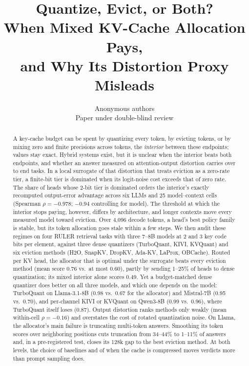 \documentclass{article}
\title{Quantize, Evict, or Both?\\
When Mixed KV-Cache Allocation Pays,\\
and Why Its Distortion Proxy Misleads}
\author{Anonymous authors \\ Paper under double-blind review}
\theoremstyle{definition}
\begin{document}
\maketitle

\begin{abstract}
A key-cache budget can be spent by quantizing every token, by evicting tokens, or by mixing zero and finite precisions across tokens, the \emph{interior} between these endpoints; values stay exact.  Hybrid systems exist, but it is unclear when the interior beats both endpoints, and whether an answer measured on attention-output distortion carries over to end tasks.  In a local surrogate of that distortion that treats eviction as a zero-rate tier, a finite-bit tier is dominated when its logit-noise cost exceeds that of zero rate.  The share of heads whose 2-bit tier is dominated orders the interior's exactly recomputed output-error advantage across six LLMs and 25 model--context cells (Spearman $\rho=-0.978$; $-0.94$ controlling for model).  The threshold at which the interior stops paying, however, differs by architecture, and longer contexts move every measured model toward eviction.  Over 4,096 decode tokens, a head's best policy family is stable, but its token allocation goes stale within a few steps.  We then audit these regimes on four RULER retrieval tasks with three 7--8B models at 2 and 3 key code bits per element, against three dense quantizers (TurboQuant, KIVI, KVQuant) and six eviction methods (H2O, SnapKV, DropKV, Ada-KV, LaProx, OBCache).  Routed per KV head, the allocator that is optimal under the surrogate beats every eviction method (mean score 0.76 vs.\ at most 0.60), partly by sending 1--25\% of heads to dense quantization; its mixed interior alone scores 0.49.
Yet a budget-matched dense quantizer does better on all three models, and which one depends on the model: TurboQuant on Llama-3.1-8B (0.98 vs.\ 0.67 for the allocator) and Mistral-7B (0.95 vs.\ 0.70), and per-channel KIVI or KVQuant on Qwen3-8B (0.99 vs.\ 0.96), where TurboQuant itself loses (0.87).  Output distortion ranks methods only weakly (mean within-cell $\rho=-0.16$) and overstates the cost of rotated quantization noise.  On Llama, the allocator's main failure is truncating multi-token answers.  Smoothing its token scores over neighboring positions cuts truncation from 34--44\% to 1--11\% of answers and, in a pre-registered test, closes its 128k gap to the best eviction method.  At both levels, the choice of baselines and of when the cache is compressed moves verdicts more than prompt sampling does.
\end{abstract}
\end{document}
